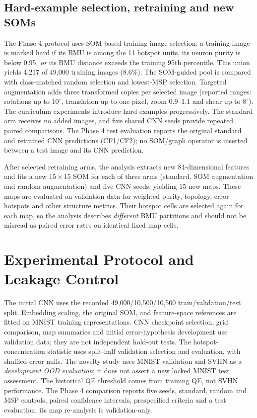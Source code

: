 \documentclass[11pt]{article}
\begin{document}
\subsection{Hard-example selection, retraining and new SOMs}\label{sec:retrainmethod}
The Phase 4 protocol uses SOM-based training-image selection: a training image is marked hard if its BMU is among the 11 hotspot units, its neuron purity is below 0.95, \emph{or} its BMU distance exceeds the training 95th percentile. This union yields 4,217 of 49,000 training images (8.6\%). The SOM-guided pool is compared with class-matched random selection and lowest-MSP selection. Targeted augmentation adds three transformed copies per selected image (reported ranges: rotations up to $10^{\circ}$, translation up to one pixel, zoom 0.9--1.1 and shear up to $8^{\circ}$). The curriculum experiments introduce hard examples progressively. The standard arm receives no added images, and five shared CNN seeds provide repeated paired comparisons. The Phase 4 test evaluation reports the original standard and retrained CNN predictions (CF1/CF2); no SOM/graph operator is inserted between a test image and its CNN prediction.

After selected retraining arms, the analysis extracts new 84-dimensional features and fits a new $15\times15$ SOM for each of three arms (standard, SOM augmentation and random augmentation) and five CNN seeds, yielding 15 new maps. These maps are evaluated on validation data for weighted purity, topology, error hotspots and other structure metrics. Their hotspot cells are selected again for each map, so the analysis describes \emph{different} BMU partitions and should not be misread as paired error rates on identical fixed map cells.

\section{Experimental Protocol and Leakage Control}\label{sec:protocol}
The initial CNN uses the recorded 49,000/10,500/10,500 train/validation/test split. Embedding scaling, the original SOM, and feature-space references are fitted on MNIST training representations. CNN checkpoint selection, grid comparison, map summaries and initial error-hypothesis development use validation data; they are not independent hold-out tests. The hotspot-concentration statistic uses split-half validation selection and evaluation, with shuffled-error nulls. The novelty study uses MNIST validation and SVHN as a \emph{development OOD evaluation}; it does not assert a new locked MNIST test assessment. The historical QE threshold comes from training QE, not SVHN performance. The Phase 4 comparison reports five seeds, standard, random and MSP controls, paired confidence intervals, prespecified criteria and a test evaluation; its map re-analysis is validation-only.
\end{document}

